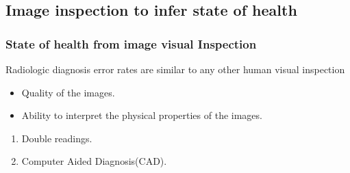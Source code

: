 \subsection{Image inspection to infer state of health}

\begin{frame}\frametitle{State of health from image visual Inspection}
\begin{block}{Radiologic diagnosis error rates are similar to any other human visual inspection}
  \begin{itemize}
    \item Quality of the images.
    \item Ability to interpret the physical properties of the images.
  \end{itemize}
\end{block}
  \begin{enumerate}
    \item Double readings.
    \item Computer Aided Diagnosis(CAD).
  \end{enumerate}
\end{frame}


